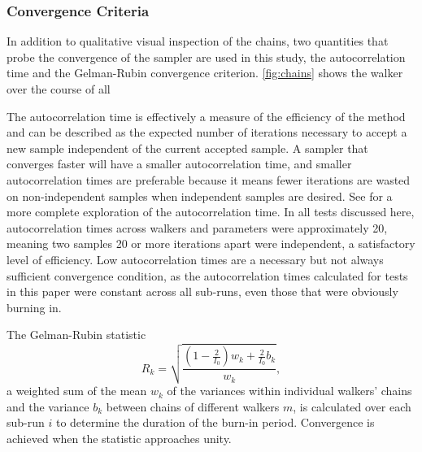 \subsubsection{Convergence Criteria}

In addition to qualitative visual inspection of the chains, two quantities that 
probe the convergence of the sampler are used in this study, the 
autocorrelation time and the Gelman-Rubin convergence criterion.  %
\ref{fig:chains} shows the %
walker over the course of all %


The autocorrelation time is effectively a measure of the efficiency of the 
method and can be described as the expected number of iterations necessary to 
accept a new sample independent of the current accepted sample.  A sampler that 
converges faster will have a smaller autocorrelation time, and smaller 
autocorrelation times are preferable because it means fewer iterations are 
wasted on non-independent samples when independent samples are desired.  See 
\citet{Foreman-Mackey2013} for a more complete exploration of the 
autocorrelation time.  In all tests discussed here, autocorrelation times 
across walkers and parameters were approximately 20, meaning two samples 20 or 
more iterations apart were independent, a satisfactory level of efficiency.  
Low autocorrelation times are a necessary but not always sufficient convergence 
condition, as the autocorrelation times calculated for tests in this paper were 
constant across all sub-runs, even those that were obviously burning in.  

The Gelman-Rubin statistic
\begin{equation}
\label{eq:gr}
R_{k} = \sqrt{\frac{(1-\frac{2}{I_{0}})w_{k}+\frac{2}{I_{0}}b_{k}}{w_{k}}},
\end{equation}
a weighted sum of the mean $w_{k}$ of the variances within individual walkers' 
chains and the variance $b_{k}$ between chains of different walkers $m$, is 
calculated over each sub-run $i$ to determine the duration of the burn-in 
period.  Convergence is achieved when the statistic approaches unity.  

